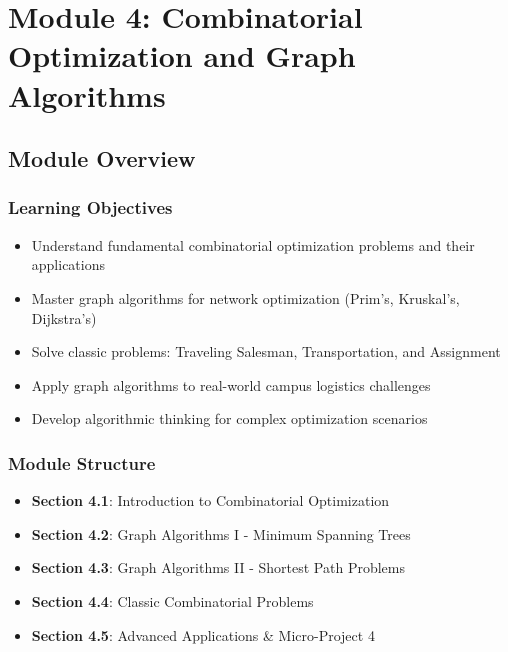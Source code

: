 \documentclass[
  letterpaper,
  DIV=11,
  numbers=noendperiod]{scrreprt}
\providecommand{\tightlist}{%
  \setlength{\itemsep}{0pt}\setlength{\parskip}{0pt}}
\begin{document}

\chapter{Module 4: Combinatorial Optimization and Graph
Algorithms}\label{module-4-combinatorial-optimization-and-graph-algorithms}

\section{Module Overview}\label{module-overview-3}

\subsection{Learning Objectives}\label{learning-objectives-4}

\begin{itemize}
\tightlist
\item
  Understand fundamental combinatorial optimization problems and their
  applications
\item
  Master graph algorithms for network optimization (Prim's, Kruskal's,
  Dijkstra's)
\item
  Solve classic problems: Traveling Salesman, Transportation, and
  Assignment
\item
  Apply graph algorithms to real-world campus logistics challenges
\item
  Develop algorithmic thinking for complex optimization scenarios
\end{itemize}

\subsection{Module Structure}\label{module-structure-2}

\begin{itemize}
\tightlist
\item
  \textbf{Section 4.1}: Introduction to Combinatorial Optimization
\item
  \textbf{Section 4.2}: Graph Algorithms I - Minimum Spanning Trees
\item
  \textbf{Section 4.3}: Graph Algorithms II - Shortest Path Problems
\item
  \textbf{Section 4.4}: Classic Combinatorial Problems
\item
  \textbf{Section 4.5}: Advanced Applications \& Micro-Project 4
\end{itemize}
\end{document}

